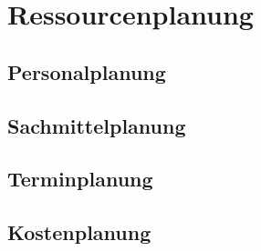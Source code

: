 
\section{Ressourcenplanung}
\label{sec:ressourcenplanung}

\subsection{Personalplanung}
\label{subsec:personalplanung}

\subsection{Sachmittelplanung}
\label{subsec:sachmittelplanung}

\subsection{Terminplanung}
\label{subsec:terminplanung}

\subsection{Kostenplanung}
\label{subsec:kostenplanung}

